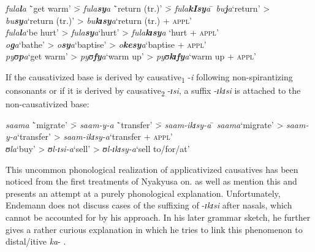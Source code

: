 \begin{exe}
\ex \label{exApplCausSpirantizing}
\begin{tabbing}
\textit{fula\textbf{l}a} \=`get warm' \= > \textit{fula\textbf{sy}a} \=`return (tr.)' \= > \textit{fula\textbf{kIsy}a} \=\kill %
\textit{bu\textbf{j}a}\>`return'\> > \textit{bu\textbf{sy}a}\>`return (tr.)'\> > \textit{bu\textbf{kɪsy}a}\>`return (tr.) + \textsc{appl}'
\\\textit{fula\textbf{l}a}\>`be hurt'\> > \textit{fula\textbf{sy}a}\>`hurt'\> > \textit{fula\textbf{kɪsy}a}\> \lq hurt + \textsc{appl}'
\\\textit{o\textbf{g}a}\>`bathe'\> > \textit{o\textbf{sy}a}\>`baptise'\> > \textit{o\textbf{kesy}a}\>`baptise + \textsc{appl}'
\\\textit{pyʊ\textbf{p}a}\>`get warm'\> > \textit{pyʊ\textbf{fy}a}\>`warm up'\> > \textit{pyʊ\textbf{kɪfy}a}\>`warm up + \textsc{appl}'
\end{tabbing}
\end{exe}

If the causativized base is derived by causative\textsubscript{1} -\textit{i} following non-spirantizing consonants or if it is derived by causative\textsubscript{2} -\textit{ɪsi}, a suffix -\textit{ɪkɪsi} is attached to the non-causativized base:%

\begin{exe}
\ex
\begin{tabbing}
\textit{saama} \=`migrate' \= > \textit{saam-y-a} \=`transfer' \= > \textit{saam-ikɪsy-a} \=\kill %
\textit{saama}\>`migrate'\> > \textit{saam-y-a}\>`transfer'\> > \textit{saam-ikɪsy-a}\>`transfer + \textsc{appl}'
\\\textit{ʊla}\>`buy'\> > \textit{ʊl-ɪsi-a}\>`sell'\> > \textit{ʊl-ɪkɪsy-a}\>`sell to/for/at'
\end{tabbing}
\end{exe}

This uncommon phonological realization of applicativized causatives has been noticed from the first treatments of Nyakyusa on. \citet{MeinhofC1966} as well as \citet{SchumannK1899} mention this and \citet{EndemannK1900} presents an attempt at a purely phonological explanation. Unfortunately, Endemann does not discuss cases of the suffixing of \mbox{-\textit{ɪkɪsi}} after nasals, which cannot be accounted for by his approach. In his later grammar sketch, he further gives a rather curious explanation in which he tries to link this phenomenon to distal/itive \textit{ka}- \citep[51]{EndemannC1914}.


